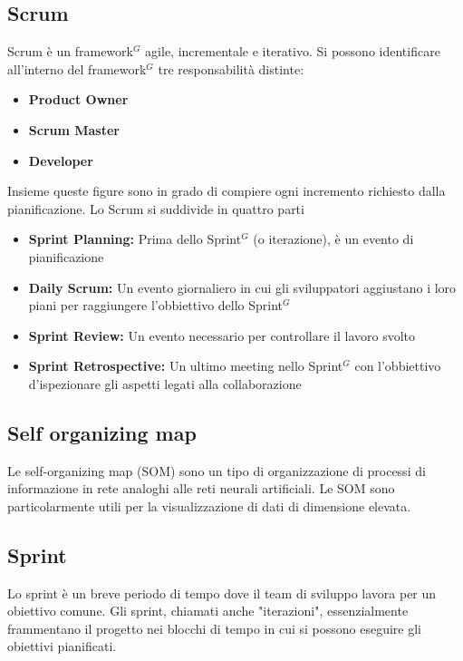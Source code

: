 \subsection{Scrum}
Scrum è un framework$^{G}$ agile, incrementale e iterativo.\newline
Si possono identificare all'interno del framework$^{G}$ tre responsabilità distinte:
\begin{itemize}
    \item \textbf{Product Owner}
    \item \textbf{Scrum Master}
    \item \textbf{Developer}
\end{itemize}
Insieme queste figure sono in grado di compiere ogni incremento richiesto dalla pianificazione.
\newline
Lo Scrum si suddivide in quattro parti
\begin{itemize}
    \item \textbf{Sprint Planning:} Prima dello Sprint$^{G}$ (o iterazione), è un evento di pianificazione
    \item \textbf{Daily Scrum:} Un evento giornaliero in cui gli sviluppatori aggiustano i loro piani per raggiungere l'obbiettivo dello Sprint$^{G}$
    \item \textbf{Sprint Review:} Un evento necessario per controllare il lavoro svolto
    \item \textbf{Sprint Retrospective:} Un ultimo meeting nello Sprint$^{G}$ con l'obbiettivo d'ispezionare gli aspetti legati alla collaborazione
\end{itemize}

\subsection{Self organizing map}
Le self-organizing map (SOM) sono un tipo di organizzazione di processi di informazione in rete analoghi alle reti neurali artificiali. Le SOM sono particolarmente utili per la visualizzazione di dati di dimensione elevata.

\subsection{Sprint}
Lo sprint è un breve periodo di tempo dove il team di sviluppo lavora per un obiettivo comune. Gli sprint, chiamati anche
"iterazioni", essenzialmente frammentano il progetto nei blocchi di tempo in cui si possono eseguire gli obiettivi pianificati.

